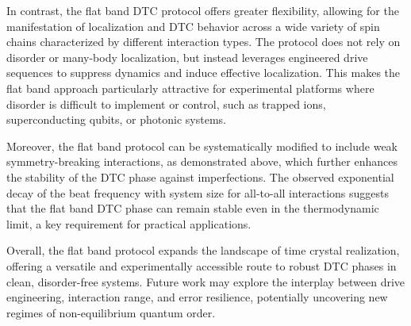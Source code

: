 \documentclass[a4paper,10pt]{article}
\begin{document}
In contrast, the flat band DTC protocol offers greater flexibility, allowing for the manifestation of localization and DTC behavior across a wide variety of spin chains characterized by different interaction types. The protocol does not rely on disorder or many-body localization, but instead leverages engineered drive sequences to suppress dynamics and induce effective localization. This makes the flat band approach particularly attractive for experimental platforms where disorder is difficult to implement or control, such as trapped ions, superconducting qubits, or photonic systems.

Moreover, the flat band protocol can be systematically modified to include weak symmetry-breaking interactions, as demonstrated above, which further enhances the stability of the DTC phase against imperfections. The observed exponential decay of the beat frequency with system size for all-to-all interactions suggests that the flat band DTC phase can remain stable even in the thermodynamic limit, a key requirement for practical applications.

Overall, the flat band protocol expands the landscape of time crystal realization, offering a versatile and experimentally accessible route to robust DTC phases in clean, disorder-free systems. Future work may explore the interplay between drive engineering, interaction range, and error resilience, potentially uncovering new regimes of non-equilibrium quantum order.





\printbibliography{}
\end{document}

